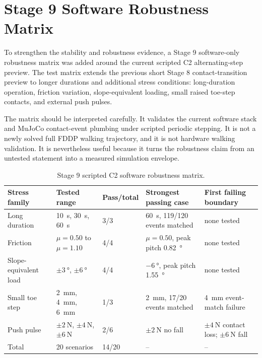 
\section{Stage 9 Software Robustness Matrix}
\label{sec:stage9_software_robustness_matrix_20260708}

To strengthen the stability and robustness evidence, a Stage 9 software-only
robustness matrix was added around the current scripted C2 alternating-step
preview. The test matrix extends the previous short Stage 8 contact-transition
preview to longer durations and additional stress conditions: long-duration
operation, friction variation, slope-equivalent loading, small raised toe-step
contacts, and external push pulses.

The matrix should be interpreted carefully. It validates the current software
stack and MuJoCo contact-event plumbing under scripted periodic stepping. It is
not a newly solved full FDDP walking trajectory, and it is not hardware walking
validation. It is nevertheless useful because it turns the robustness claim
from an untested statement into a measured simulation envelope.

\begin{table}[htbp]
\centering
\caption{Stage 9 scripted C2 software robustness matrix.}
\label{tab:stage9_robustness_matrix_20260708}
\scriptsize
\begin{tabular}{@{}p{}p{}p{}p{}p{}@{}}
\toprule
Stress family & Tested range & Pass/total & Strongest passing case & First failing boundary \\
\midrule
Long duration & \SI{10}{\second}, \SI{30}{\second}, \SI{60}{\second} & 3/3 & \SI{60}{\second}, 119/120 events matched & none tested \\
Friction & $\mu=0.50$ to $\mu=1.10$ & 4/4 & $\mu=0.50$, peak pitch \SI{0.82}{\degree} & none tested \\
Slope-equivalent load & $\pm\SI{3}{\degree}$, $\pm\SI{6}{\degree}$ & 4/4 & $-\SI{6}{\degree}$, peak pitch \SI{1.55}{\degree} & none tested \\
Small toe step & \SI{2}{\milli\metre}, \SI{4}{\milli\metre}, \SI{6}{\milli\metre} & 1/3 & \SI{2}{\milli\metre}, 17/20 events matched & \SI{4}{\milli\metre} event-match failure \\
Push pulse & $\pm\SI{2}{\newton}$, $\pm\SI{4}{\newton}$, $\pm\SI{6}{\newton}$ & 2/6 & $\pm\SI{2}{\newton}$ no fall & $\pm\SI{4}{\newton}$ contact loss; $\pm\SI{6}{\newton}$ fall \\
\midrule
Total & 20 scenarios & 14/20 & -- & -- \\
\bottomrule
\end{tabular}
\end{table}

